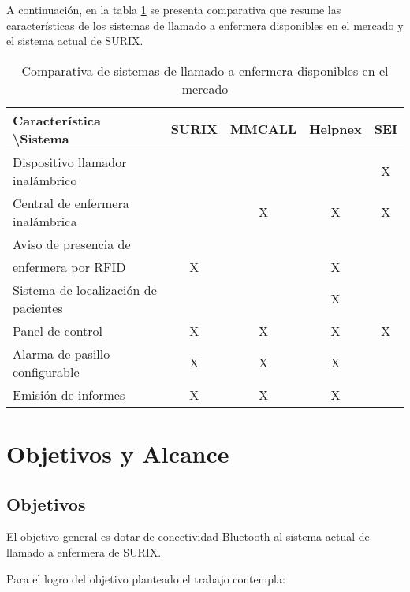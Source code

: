 A continuación, en la tabla \ref{tab:sistemasDeLLamadoEnfermera} se presenta comparativa que resume las características de los sistemas de llamado a enfermera disponibles en el mercado y el sistema actual de SURIX.

\begin{table}[h]
	\centering
	\caption[Sistemas de llamado a enfermera]{Comparativa de sistemas de llamado a enfermera disponibles en el mercado}
	\begin{tabular}{l c c c c}    
		\toprule
		\textbf{Característica \textbackslash Sistema} 	 & \textbf{SURIX} & \textbf{MMCALL} & \textbf{Helpnex} & \textbf{SEI}\\
		\midrule
		Dispositivo llamador inalámbrico 				&  	&  	&  	& X \\
		Central de enfermera inalámbrica 				&  	& X & X & X \\
		Aviso de presencia de\\enfermera por RFID 		& X	&  	& X	&   \\
		Sistema de localización de pacientes 			&  	&  	& X	&   \\
		Panel de control 								& X	& X	& X	& X \\
		Alarma de pasillo configurable	 				& X	& X	& X	&   \\
		Emisión de informes				 				& X	& X	& X	&   \\
		\bottomrule
		\hline
	\end{tabular}
	\label{tab:sistemasDeLLamadoEnfermera}
\end{table}



\section{Objetivos y Alcance}

\subsection{Objetivos}

El objetivo general es dotar de conectividad Bluetooth al sistema actual de llamado a enfermera de SURIX.

Para el logro del objetivo planteado el trabajo contempla:

